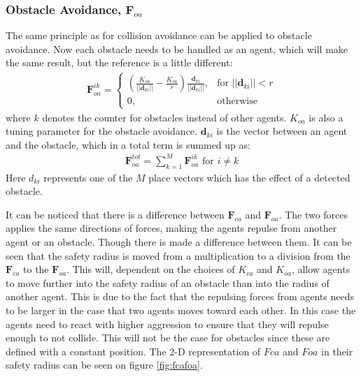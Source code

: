 \subsubsection{Obstacle Avoidance, $\mathbf{F}_{oa}$}
The same principle as for collision avoidance can be applied to
obstacle avoidance. Now each obstacle needs to be handled as an agent,
which will make the same result, but the reference is a little
different:
\begin{align}
    \mathbf{F}_{oa}^{ik}= 
\begin{cases}
    \left( \frac{K_{oa}}{||\mathbf{d}_{ki}||}-\frac{K_{oa}}{r}\right)
		\frac{\mathbf{d}_{{ki}}}{||\mathbf{d}_{ki}||},& \text{for } ||\mathbf{d}_{ki}||<r\\
    0,              & \text{otherwise}
\end{cases}
\end{align}
where $k$ denotes the counter for obstacles instead of other agents.
$K_{oa}$ is also a tuning parameter for the obstacle avoidance.
$\mathbf{d}_{ki}$ is the vector between an agent and the obstacle, which in a
total term is summed up as:
\begin{align}
\mathbf{F}_{oa}^{tot} = \sum\limits_{k=1}^M\mathbf{F}_{oa}^{ik} \text{ for } i\neq k
\end{align}
Here $d_{ki}$ represents one of the $M$ place vectors which has the
effect of a detected obstacle.

It can be noticed that there is a difference between $\mathbf{F}_{ca}$ and $\mathbf{F}_{oa}$. The two forces applies the same directions of forces, making the agents repulse from another agent or an obstacle. Though there is made a difference between them. It can be seen that the safety radius is moved from a multiplication to a division from the $\mathbf{F}_{ca}$ to the $\mathbf{F}_{oa}$. This will, dependent on the choices of $K_{ca}$ and $K_{oa}$, allow agents to move further into the safety radius of an obstacle than into the radius of another agent. This is due to the fact that the repulsing forces from agents needs to be larger in the case that two agents moves toward each other. In this case the agents need to react with higher aggression to ensure that they will repulse enough to not collide. This will not be the case for obstacles since these are defined with a constant position. The 2-D representation of $Fca$ and $Foa$ in their safety radius can be seen on figure \ref{fig:fcafoa}.

